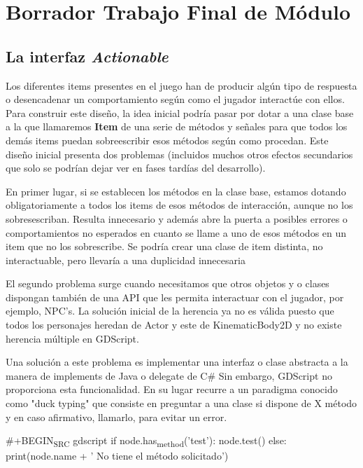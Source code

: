 \documentclass[11pt]{article}
\author{kalaix}
\date{\today}
\title{}
\begin{document}
\tableofcontents

\section{Borrador Trabajo Final de Módulo}
\label{sec:org2df177a}


\subsection{La interfaz \emph{Actionable}}
\label{sec:org297fb24}

Los diferentes items presentes en el juego han de producir algún tipo de respuesta o desencadenar un comportamiento según como el jugador interactúe con ellos. Para construir este diseño, la idea inicial podría pasar por dotar a una clase base a la que llamaremos \textbf{Item} de una serie de métodos y señales para que todos los demás items puedan sobreescribir esos métodos según como procedan. Este diseño inicial presenta dos problemas (incluidos muchos otros efectos secundarios que solo se podrían dejar ver en fases tardías del desarrollo).

En primer lugar, si se establecen los métodos en la clase base, estamos dotando obligatoriamente a todos los items de esos métodos de interacción, aunque no los sobresescriban. Resulta innecesario y además abre la puerta a posibles errores o comportamientos no esperados en cuanto se llame a uno de esos métodos en un item que no los sobrescribe. Se podría crear una clase de item distinta, no interactuable, pero llevaría a una duplicidad innecesaria

El segundo problema surge cuando necesitamos que otros objetos y o clases dispongan también de una API que les permita interactuar con el jugador, por ejemplo, NPC's. La solución inicial de la herencia ya no es válida puesto que todos los personajes heredan de Actor y este de KinematicBody2D y no existe herencia múltiple en GDScript.

Una solución a este problema es implementar una interfaz o clase abstracta a la manera de implements de Java o delegate de C\# Sin embargo, GDScript no proporciona esta funcionalidad. En su lugar recurre a un paradigma conocido como "duck typing" que consiste en preguntar a una clase si dispone de X método y en caso afirmativo, llamarlo, para evitar un error.

\#+BEGIN\textsubscript{SRC} gdscript
if node.has\textsubscript{method}('test'):
    node.test()
else:
    print(node.name + ' No tiene el método solicitado')
\end{document}
